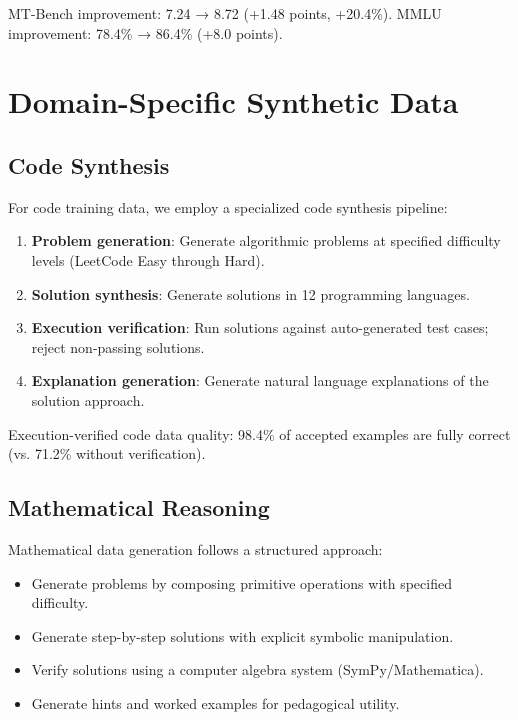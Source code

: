 \documentclass[11pt,a4paper]{article}
\begin{document}
MT-Bench improvement: 7.24 → 8.72 (+1.48 points, +20.4\%). MMLU improvement: 78.4\% → 86.4\% (+8.0 points).

\section{Domain-Specific Synthetic Data}

\subsection{Code Synthesis}

For code training data, we employ a specialized code synthesis pipeline:

\begin{enumerate}
  \item \textbf{Problem generation}: Generate algorithmic problems at specified difficulty levels (LeetCode Easy through Hard).
  \item \textbf{Solution synthesis}: Generate solutions in 12 programming languages.
  \item \textbf{Execution verification}: Run solutions against auto-generated test cases; reject non-passing solutions.
  \item \textbf{Explanation generation}: Generate natural language explanations of the solution approach.
\end{enumerate}

Execution-verified code data quality: 98.4\% of accepted examples are fully correct (vs. 71.2\% without verification).

\subsection{Mathematical Reasoning}

Mathematical data generation follows a structured approach:
\begin{itemize}
  \item Generate problems by composing primitive operations with specified difficulty.
  \item Generate step-by-step solutions with explicit symbolic manipulation.
  \item Verify solutions using a computer algebra system (SymPy/Mathematica).
  \item Generate hints and worked examples for pedagogical utility.
\end{itemize}
\end{document}
